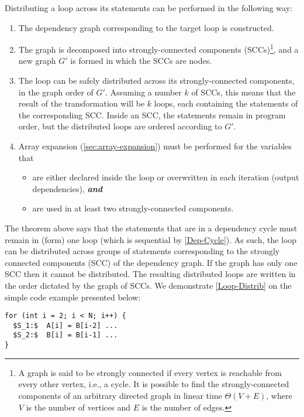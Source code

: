 \begin{theorem}\label{Loop-Distrib}
  Distributing a loop across its statements can be performed
  in the following way:
  \begin{enumerate}
  \item The dependency graph corresponding to the target loop
    is constructed.
  \item The graph is decomposed into strongly-connected components
    (SCCs)\footnote{
      A graph is said to be strongly connected if every vertex
      is reachable from every other vertex, i.e., a cycle.
      It is possible to find the strongly-connected components
      of an arbitrary directed graph in linear time $\Theta(V+E)$,
      where $V$ is the number of vertices and $E$ is the number of
      edges.
    }, and a new graph $G'$ is formed in which the SCCs are nodes.
  \item The loop can be safely distributed across its
    strongly-connected components, in the graph order of $G'$.
    Assuming a number $k$ of SCCs, this means that the result of the
    transformation will be $k$ loops, each containing the statements
    of the corresponding SCC. Inside an SCC, the statements remain in
    program order, but the distributed loops are ordered according to
    $G'$.
  \item Array expansion (\cref{sec:array-expansion}) must be performed
    for the variables that
    \begin{itemize}
    \item are either declared inside the loop or overwritten
      in each iteration (output dependencies), \textbf{\em and}
    \item are used in at least two strongly-connected components.
    \end{itemize}
  \end{enumerate}
\end{theorem}

The theorem above says that the statements that are in a dependency
cycle must remain in (form) one loop (which is sequential by
\cref{Dep-Cycle}). As such, the loop can be distributed across groups
of statements corresponding to the strongly connected components (SCC)
of the dependency graph. If the graph has only one SCC then it cannot
be distributed.  The resulting distributed loops are written in the
order dictated by the graph of SCCs.
%
We demonstrate \cref{Loop-Distrib} on the simple code example presented
below:
\begin{lstlisting}[mathescape=true]
for (int i = 2; i < N; i++) {
  $S_1:$  A[i] = B[i-2] ...
  $S_2:$  B[i] = B[i-1] ...
}
\end{lstlisting}

